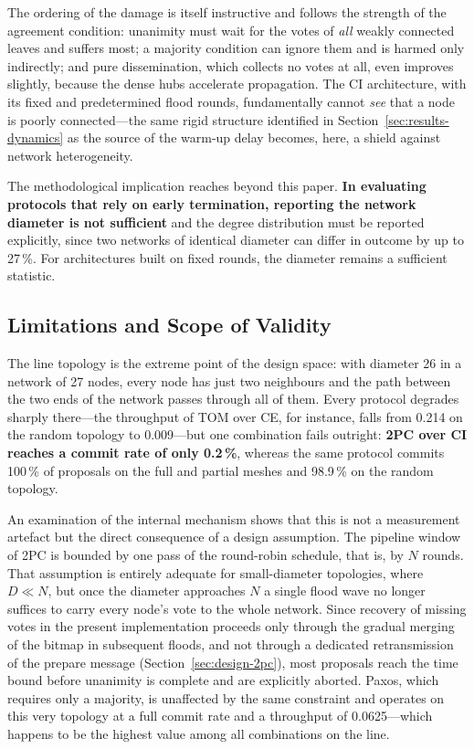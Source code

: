 \documentclass[journal]{IEEEtran}
\newcommand{\CI}{CI}                      %
\newcommand{\CE}{CE}                      %
\newcommand{\Nnodes}{N}                   %
\newcommand{\Diam}{D}                     %
\begin{document}
The ordering of the damage is itself instructive and follows the strength
of the agreement condition: unanimity must wait for the votes of
\emph{all} weakly connected leaves and suffers most; a majority condition
can ignore them and is harmed only indirectly; and pure dissemination,
which collects no votes at all, even improves slightly, because the dense
hubs accelerate propagation. The \CI{} architecture, with its fixed and
predetermined flood rounds, fundamentally cannot \emph{see} that a node is
poorly connected---the same rigid structure identified in
Section~\ref{sec:results-dynamics} as the source of the warm-up delay
becomes, here, a shield against network heterogeneity.

The methodological implication reaches beyond this paper.
\textbf{In evaluating protocols that rely on early termination, reporting
the network diameter is not sufficient} and the degree distribution must
be reported explicitly, since two networks of identical diameter can
differ in outcome by up to 27\,\%. For architectures built on fixed rounds,
the diameter remains a sufficient statistic.

\subsection{Limitations and Scope of Validity}
\label{sec:results-limitations}

The line topology is the extreme point of the design space: with diameter
26 in a network of 27 nodes, every node has just two neighbours and the
path between the two ends of the network passes through all of them. Every
protocol degrades sharply there---the throughput of TOM over \CE, for
instance, falls from 0.214 on the random topology to 0.009---but one
combination fails outright: \textbf{2PC over \CI{} reaches a commit rate of
only 0.2\,\%}, whereas the same protocol commits 100\,\% of proposals on
the full and partial meshes and 98.9\,\% on the random topology.

An examination of the internal mechanism shows that this is not a
measurement artefact but the direct consequence of a design assumption.
The pipeline window of 2PC is bounded by one pass of the round-robin
schedule, that is, by $\Nnodes$ rounds. That assumption is entirely
adequate for small-diameter topologies, where $\Diam \ll \Nnodes$, but
once the diameter approaches $\Nnodes$ a single flood wave no longer
suffices to carry every node's vote to the whole network. Since recovery
of missing votes in the present implementation proceeds only through the
gradual merging of the bitmap in subsequent floods, and not through a
dedicated retransmission of the prepare message
(Section~\ref{sec:design-2pc}), most proposals reach the time bound before
unanimity is complete and are explicitly aborted. Paxos, which requires
only a majority, is unaffected by the same constraint and operates on this
very topology at a full commit rate and a throughput of 0.0625---which
happens to be the highest value among all combinations on the line.
\end{document}

